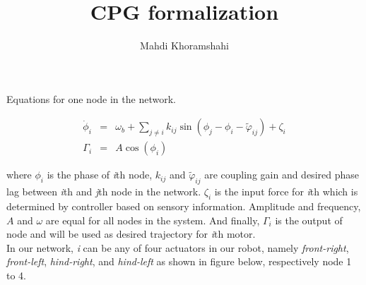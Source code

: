 \documentclass{article}
\begin{document}
\title{CPG formalization}
\author{Mahdi Khoramshahi}
\maketitle

Equations for one node in the network.

\begin{eqnarray}\label{eq:one_node}
	\dot \phi_i &=& \omega_{b} + \sum_{j \neq i} k_{ij} \sin \left( \phi_j - \phi_i - \tilde{\varphi}_{ij} \right ) + \zeta_i\\
	\Gamma_i    &=& A \cos(\phi_i)
\end{eqnarray}

where $\phi_i$ is the phase of \textit{i}th node, $k_{ij}$ and $\tilde{\varphi}_{ij}$ are coupling gain and desired phase lag between \textit{i}th and \textit{j}th node in the network. $\zeta_i$ is the input force for \textit{i}th which is determined by controller based on sensory information. 
Amplitude and frequency, $A$ and $\omega$ are equal for all nodes in the system. And finally, $\Gamma_i$ is the output of node and will be used as desired trajectory for \textit{i}th motor. \\

In our network, \textit{i} can be any of four actuators in our robot, namely \textit{front-right}, \textit{front-left}, \textit{hind-right}, and  \textit{hind-left} as shown in figure below, respectively node 1 to 4.
\end{document}
